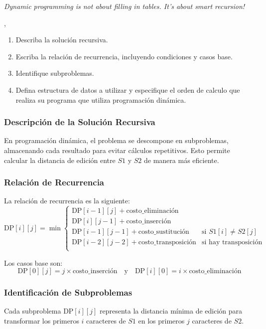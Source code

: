 
\epigraph{\textit{Dynamic programming is not about filling in tables. It's about smart recursion!}}{\citeauthor{algorithms_erickson}, \citeyear{algorithms_erickson} \cite{algorithms_erickson}}

\begin{enumerate}[1)]
    \item Describa la solución recursiva.
    \item Escriba la relación de recurrencia, incluyendo condiciones y casos base.
    \item Identifique subproblemas.
    \item Defina estructura de datos a utilizar y especifique el orden de calculo que realiza su programa que utiliza programación dinámica. 
\end{enumerate}

\subsubsection{Descripción de la Solución Recursiva}
En programación dinámica, el problema se descompone en subproblemas, almacenando cada resultado para evitar cálculos repetitivos. Esto permite calcular la distancia de edición entre \( S1 \) y \( S2 \) de manera más eficiente.

\subsubsection{Relación de Recurrencia}
La relación de recurrencia es la siguiente:
\[
\text{DP}[i][j] = \min \begin{cases} 
    \text{DP}[i-1][j] + \text{costo\_eliminación} \\
    \text{DP}[i][j-1] + \text{costo\_inserción} \\
    \text{DP}[i-1][j-1] + \text{costo\_sustitución} & \text{si } S1[i] \neq S2[j] \\
    \text{DP}[i-2][j-2] + \text{costo\_transposición} & \text{si hay transposición} \\
\end{cases}
\]

Los casos base son:
\[
\text{DP}[0][j] = j \times \text{costo\_inserción} \quad \text{y} \quad \text{DP}[i][0] = i \times \text{costo\_eliminación}
\]

\subsubsection{Identificación de Subproblemas}
Cada subproblema \( \text{DP}[i][j] \) representa la distancia mínima de edición para transformar los primeros \( i \) caracteres de \( S1 \) en los primeros \( j \) caracteres de \( S2 \).



